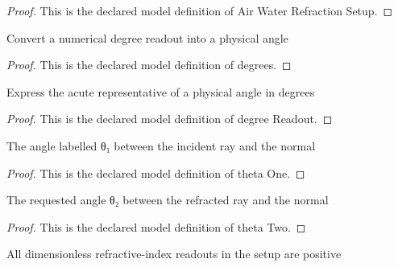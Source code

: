\begin{proof}
  This is the declared model definition of Air Water Refraction Setup.
\end{proof}
\begin{definition}[degrees]
  \label{def:physics:phyx-mini-0001:phyxminiproblems-problemphyxmini0001-degrees}
  Convert a numerical degree readout into a physical angle
\end{definition}
\begin{proof}
  This is the declared model definition of degrees.
\end{proof}
\begin{definition}
  \label{def:physics:phyx-mini-0001:phyxminiproblems-problemphyxmini0001-degreereadout}
  Express the acute representative of a physical angle in degrees
\end{definition}
\begin{proof}
  This is the declared model definition of degree Readout.
\end{proof}
\begin{definition}
  \label{def:physics:phyx-mini-0001:phyxminiproblems-problemphyxmini0001-thetaone}
  The angle labelled θ₁ between the incident ray and the normal
\end{definition}
\begin{proof}
  This is the declared model definition of theta One.
\end{proof}
\begin{definition}
  \label{def:physics:phyx-mini-0001:phyxminiproblems-problemphyxmini0001-thetatwo}
  The requested angle θ₂ between the refracted ray and the normal
\end{definition}
\begin{proof}
  This is the declared model definition of theta Two.
\end{proof}
\begin{definition}
  \label{def:physics:phyx-mini-0001:phyxminiproblems-problemphyxmini0001-haspositiverefractiveindices}
  All dimensionless refractive-index readouts in the setup are positive
\end{definition}
